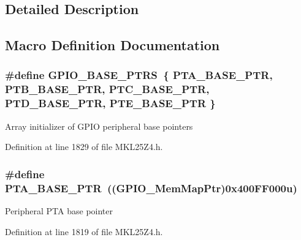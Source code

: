\subsection{Detailed Description}


\subsection{Macro Definition Documentation}
\subsubsection[{\texorpdfstring{G\+P\+I\+O\+\_\+\+B\+A\+S\+E\+\_\+\+P\+T\+RS}{GPIO_BASE_PTRS}}]{\setlength{\rightskip}{0pt plus 5cm}\#define G\+P\+I\+O\+\_\+\+B\+A\+S\+E\+\_\+\+P\+T\+RS~\{ {\bf P\+T\+A\+\_\+\+B\+A\+S\+E\+\_\+\+P\+TR}, {\bf P\+T\+B\+\_\+\+B\+A\+S\+E\+\_\+\+P\+TR}, {\bf P\+T\+C\+\_\+\+B\+A\+S\+E\+\_\+\+P\+TR}, {\bf P\+T\+D\+\_\+\+B\+A\+S\+E\+\_\+\+P\+TR}, {\bf P\+T\+E\+\_\+\+B\+A\+S\+E\+\_\+\+P\+TR} \}}\hypertarget{group___g_p_i_o___peripheral_gad0f7206167a584b1e75a81a5c30fa1c2}{}\label{group___g_p_i_o___peripheral_gad0f7206167a584b1e75a81a5c30fa1c2}
Array initializer of G\+P\+IO peripheral base pointers 

Definition at line 1829 of file M\+K\+L25\+Z4.\+h.

\subsubsection[{\texorpdfstring{P\+T\+A\+\_\+\+B\+A\+S\+E\+\_\+\+P\+TR}{PTA_BASE_PTR}}]{\setlength{\rightskip}{0pt plus 5cm}\#define P\+T\+A\+\_\+\+B\+A\+S\+E\+\_\+\+P\+TR~(({\bf G\+P\+I\+O\+\_\+\+Mem\+Map\+Ptr})0x400\+F\+F000u)}\hypertarget{group___g_p_i_o___peripheral_gadf98f6ee2bbfd42102e378a66b29b9ef}{}\label{group___g_p_i_o___peripheral_gadf98f6ee2bbfd42102e378a66b29b9ef}
Peripheral P\+TA base pointer 

Definition at line 1819 of file M\+K\+L25\+Z4.\+h.

